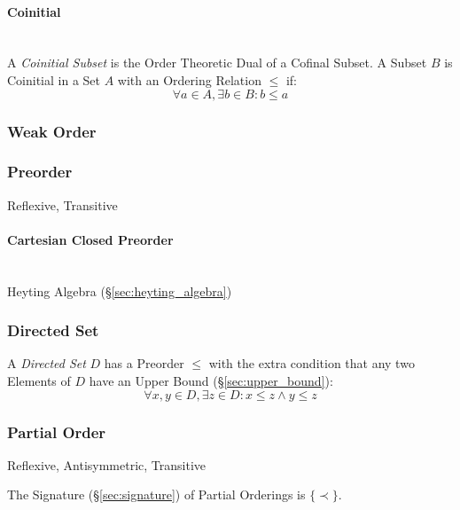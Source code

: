 \paragraph{Coinitial}\label{sec:coinitial}
\hfill \\

A \emph{Coinitial Subset} is the Order Theoretic Dual of a Cofinal
Subset. A Subset $B$ is Coinitial in a Set $A$ with an Ordering
Relation $\leq$ if:
\[
  \forall a \in A, \exists b \in B : b \leq a
\]



\subsubsection{Weak Order}\label{sec:weak_order}

\subsubsection{Preorder}\label{sec:preorder}

Reflexive, Transitive


\paragraph{Cartesian Closed Preorder}\label{sec:cartesian_preorder}
\hfill \\

Heyting Algebra (\S\ref{sec:heyting_algebra})



\subsubsection{Directed Set}\label{sec:directed_set}

A \emph{Directed Set} $D$ has a Preorder $\leq$ with the extra
condition that any two Elements of $D$ have an Upper Bound
(\S\ref{sec:upper_bound}):
\[
  \forall x, y \in D, \exists z \in D : x \leq z \wedge y \leq z
\]



\subsubsection{Partial Order}\label{sec:partial_order}

Reflexive, Antisymmetric, Transitive

The Signature (\S\ref{sec:signature}) of Partial Orderings is
$\{\prec\}$.



